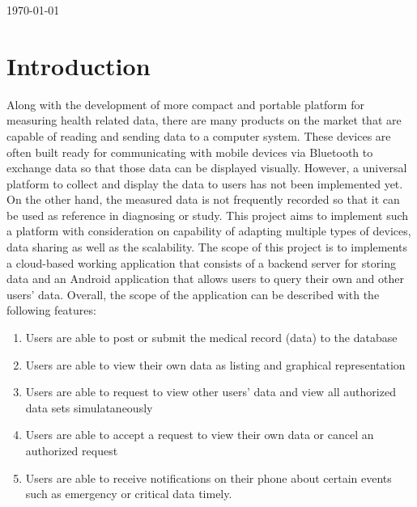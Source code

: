 \begin{titlepage}


{\large \today}\\[2cm] %



\vfill %
\end{titlepage}

\linespread{1.25}

\section{Introduction}
Along with the development of more compact and portable platform for measuring health related data, there are many
products on the market that are capable of reading and sending data to a computer system. These devices are often built
ready for communicating with mobile devices via Bluetooth to exchange data so that those data can be displayed visually.
However, a universal platform to collect and display the data to users has not been implemented yet. On the other hand,
the measured data is not frequently recorded so that it can be used as reference in diagnosing or study.  This project
aims to implement such a platform with consideration on capability of adapting multiple types of devices, data sharing
as well as the scalability.
The scope of this project is to implements a cloud-based working application that consists of a backend server for
storing data and an Android application that allows users to query their own and other users' data. Overall, 
the scope of the application can be described with the following features:
\begin{enumerate}
    \item Users are able to post or submit the medical record (data) to the database
    \item Users are able to view their own data as listing and graphical representation
    \item Users are able to request to view other users' data and view all authorized data sets simulataneously
    \item Users are able to accept a request to view their own data or cancel an authorized request
    \item Users are able to receive notifications on their phone about certain events such as emergency or critical
        data timely.
\end{enumerate}
